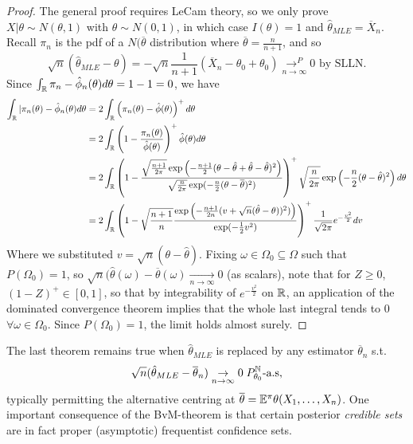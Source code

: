 \documentclass[a4paper]{article}
\begin{document}
\begin{proof}
	The general proof requires LeCam theory, so we only prove $X|\theta \sim N(\theta, 1)$ with  $\theta \sim N(0,1)$, in which case $I(\theta) = 1$ and $\hat{\theta}_{MLE} = \overline{X}_{n}$. Recall $\pi_n$ is the pdf of a $N(\overline{\theta}$ distribution where $ \overline{\theta} = \frac{n}{n+1}$, and so
	\[
		\sqrt{n} (\hat{\theta}_{MLE} - \theta) = - \sqrt{n} \frac{1}{n+1} (\overline{X}_n - \theta_0 + \theta_0) \underset{n\to \infty}{\to ^{P}} 0 \text{ by SLLN.}
	\] 
	Since $\int_{\mathbb{R}} \pi_n - \hat{\phi}_n(\theta) d\theta = 1-1 = 0$, we have 
	\begin{align*}
		\int_{\mathbb{R}} |\pi_n (\theta) - \hat{\phi}_n(\theta) d\theta &= 2\int_{\mathbb{R}} \left( \pi_n(\theta) - \hat{\phi}(\theta) \right)^{+} d\theta  \\
		&= 2\int_{\mathbb{R}} \left( 1 - \frac{\pi_n(\theta)}{\hat{\phi}(\theta)} \right) ^{+} \hat{\phi}(\theta) d\theta \\
		&= 2\int_{\mathbb{R}} \left( 1 - \frac{\sqrt{\frac{n+1}{2\pi}} \exp\left(-\frac{n+1}{2}(\theta - \hat{\theta} + \hat{\theta} - \hat{\theta})^2\right) }{\sqrt{\frac{n}{2\pi}} \exp(-\frac{n}{2}(\theta - \overline{\theta})^2) } \right)^{+} \sqrt{\frac{n}{2\pi}} \exp\left( -\frac{n}{2}(\theta - \hat{\theta})^2 \right) d\theta  \\
		&= 2\int_{\mathbb{R}} \left( 1 - \sqrt{\frac{n+1}{n}} \frac{\exp\left( - \frac{n+1}{2n} (v + \sqrt{n} (\hat{\theta} - \theta))^2) \right) }{\exp(-\frac{1}{2}v^2) } \right)^{+} \frac{1}{\sqrt{2\pi} } e^{-\frac{v^2}{2}} dv
	\end{align*}
	Where we substituted $v = \sqrt{n} (\theta - \hat{\theta})$. Fixing  $\omega \in \Omega_0 \subseteq \Omega$ such that $P\left( \Omega_0 \right) = 1$, so $\sqrt{n} (\hat{\theta}(\omega) - \overline{\theta}(\omega) \underset{n\to \infty}{\to } 0 $ (as scalars), note that for $Z\ge 0$, $(1-Z)^{+} \in [0,1]$, so that by integrability of $e^{-\frac{v^2}{2}}$ on $\mathbb{R}$, an application of the dominated convergence theorem implies that the whole last integral tends to $0$ $\forall \omega \in \Omega_0$. Since $P\left( \Omega_0 \right) = 1$, the limit holds almost surely.
\end{proof}

The last theorem remains true when $\hat{\theta}_{MLE}$ is replaced by any estimator $\overline{\theta}_n$ s.t.
\[
	\sqrt{n} (\hat{\theta}_{MLE} - \overline{\theta}_n) \underset{n\to \infty}{\to } 0 \;P_{\theta_0}^{\mathbb{N}}\text{-a.s}
,\] typically permitting the alternative centring at $\overline{\theta} = \mathbb{E}^{\pi} \theta(X_1, \ldots, X_n)$. One important consequence of the BvM-theorem is that certain posterior \textit{credible sets} are in fact proper (asymptotic) frequentist confidence sets.
\end{document}
